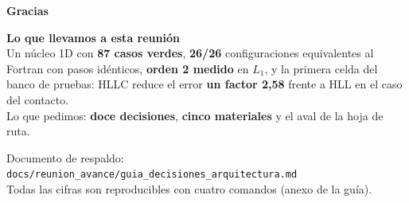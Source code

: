 \documentclass[aspectratio=169,10pt]{beamer}
\newcommand{\cod}[1]{\texttt{\small #1}}
\begin{document}
\begin{frame}[plain]
  \centering
  \vspace{1.2cm}
  {\Large\textbf{Gracias}}

  \vspace{0.8cm}
  \begin{minipage}{0.82\textwidth}
    \small
    \begin{center}
      \textbf{Lo que llevamos a esta reunión}
      \\[6pt]
      Un núcleo 1D con \textbf{87 casos verdes}, \textbf{26/26} configuraciones
      equivalentes al Fortran con pasos idénticos, \textbf{orden 2 medido} en $L_1$,
      y la primera celda del banco de pruebas: HLLC reduce el error
      \textbf{un factor 2{,}58} frente a HLL en el caso del contacto.
      \\[8pt]
      Lo que pedimos: \textbf{doce decisiones}, \textbf{cinco materiales} y el
      aval de la hoja de ruta.
    \end{center}
  \end{minipage}

  \vspace{1cm}
  {\scriptsize\color{gris}
   Documento de respaldo: \cod{docs/reunion\_avance/guia\_decisiones\_arquitectura.md}\\
   Todas las cifras son reproducibles con cuatro comandos (anexo de la guía).}
\end{frame}
\end{document}
